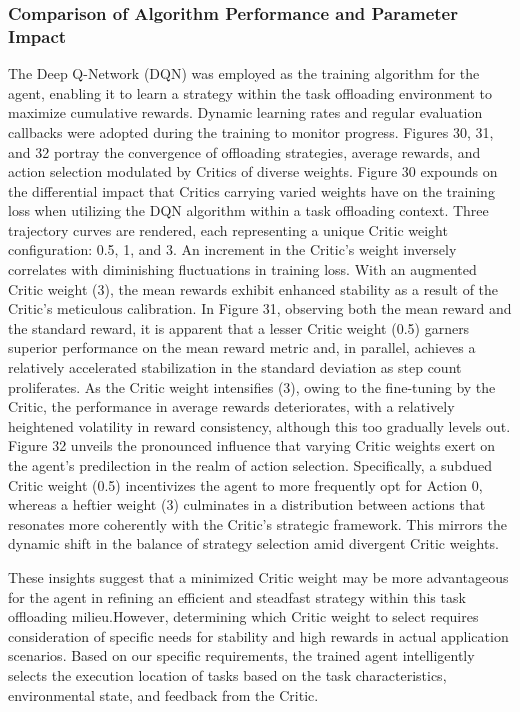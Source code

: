 \documentclass[preprint,12pt]{elsarticle}
\begin{document}
\subsubsection{Comparison of Algorithm Performance and Parameter Impact}

The Deep Q-Network (DQN) was employed as the training algorithm for the agent, enabling it to learn a strategy within the task offloading environment to maximize cumulative rewards. Dynamic learning rates and regular evaluation callbacks were adopted during the training to monitor progress. Figures 30, 31, and 32 portray the convergence of offloading strategies, average rewards, and action selection modulated by Critics of diverse weights. Figure 30 expounds on the differential impact that Critics carrying varied weights have on the training loss when utilizing the DQN algorithm within a task offloading context. Three trajectory curves are rendered, each representing a unique Critic weight configuration: 0.5, 1, and 3. An increment in the Critic's weight inversely correlates with diminishing fluctuations in training loss. With an augmented Critic weight (3), the mean rewards exhibit enhanced stability as a result of the Critic's meticulous calibration. In Figure 31, observing both the mean reward and the standard reward, it is apparent that a lesser Critic weight (0.5) garners superior performance on the mean reward metric and, in parallel, achieves a relatively accelerated stabilization in the standard deviation as step count proliferates. As the Critic weight intensifies (3), owing to the fine-tuning by the Critic, the performance in average rewards deteriorates, with a relatively heightened volatility in reward consistency, although this too gradually levels out. Figure 32 unveils the pronounced influence that varying Critic weights exert on the agent’s predilection in the realm of action selection. Specifically, a subdued Critic weight (0.5) incentivizes the agent to more frequently opt for Action 0, whereas a heftier weight (3) culminates in a distribution between actions that resonates more coherently with the Critic's strategic framework. This mirrors the dynamic shift in the balance of strategy selection amid divergent Critic weights. 

These insights suggest that a minimized Critic weight may be more advantageous for the agent in refining an efficient and steadfast strategy within this task offloading milieu.However, determining which Critic weight to select requires consideration of specific needs for stability and high rewards in actual application scenarios. Based on our specific requirements, the trained agent intelligently selects the execution location of tasks based on the task characteristics, environmental state, and feedback from the Critic.
\end{document}
